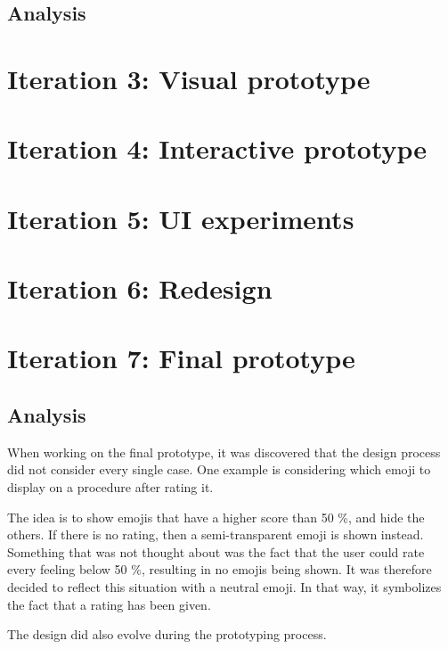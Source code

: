 \subsection{Analysis}

\section{Iteration 3: Visual prototype}
\label{sec:iteration3}

\section{Iteration 4: Interactive prototype}
\label{sec:iteration4}

\section{Iteration 5: UI experiments}
\label{sec:iteration5}

\section{Iteration 6: Redesign}
\label{sec:iteration6}

\section{Iteration 7: Final prototype}
\label{sec:iteration7}

\subsection{Analysis}
When working on the final prototype, it was discovered that the design process did not consider every single case. One example is considering which emoji to display on a procedure after rating it.

The idea is to show emojis that have a higher score than 50 \%, and hide the others. If there is no rating, then a semi-transparent emoji is shown instead. Something that was not thought about was the fact that the user could rate every feeling below 50 \%, resulting in no emojis being shown. It was therefore decided to reflect this situation with a neutral emoji. In that way, it symbolizes the fact that a rating has been given.

The design did also evolve during the prototyping process.
